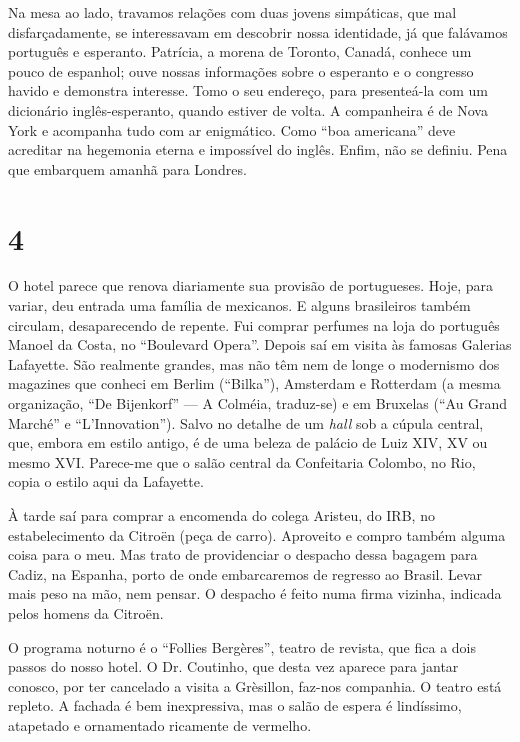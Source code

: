 Na mesa ao lado, travamos relações com duas jovens simpáticas, que mal disfarçadamente, se interessavam em descobrir nossa identidade, já que falávamos português e esperanto. Patrícia, a morena de Toronto, Canadá, conhece um pouco de espanhol; ouve nossas informações sobre o esperanto e o congresso havido e demonstra interesse. Tomo o seu endereço, para presenteá-la com um dicionário inglês-esperanto, quando estiver de volta. A companheira é de Nova York e acompanha tudo com ar enigmático. Como ``boa americana'' deve acreditar na hegemonia eterna e impossível do inglês. Enfim, não se definiu. Pena que embarquem amanhã para Londres.

\section*{4 \adfflatleafright {}}
O hotel parece que renova diariamente sua provisão de portugueses. Hoje, para variar, deu entrada uma família de mexicanos. E alguns brasileiros também circulam, desaparecendo de repente. Fui comprar perfumes na loja do português Manoel da Costa, no ``Boulevard Opera''. Depois saí em visita às famosas Galerias Lafayette. São realmente grandes, mas não têm nem de longe o modernismo dos magazines que conheci em Berlim (``Bilka''), Amsterdam e Rotterdam (a mesma organização, ``De Bijenkorf'' --- A Colméia, traduz-se) e em Bruxelas (``Au Grand Marché'' e ``L’Innovation''). Salvo no detalhe de um \textit{hall} sob a cúpula central, que, embora em estilo antigo, é de uma beleza de palácio de Luiz XIV, XV ou mesmo XVI. Parece-me que o salão central da Confeitaria Colombo, no Rio, copia o estilo aqui da Lafayette.

À tarde saí para comprar a encomenda do colega Aristeu, do IRB, no estabelecimento da Citroën (peça de carro). Aproveito e compro também alguma coisa para o meu. Mas trato de providenciar o despacho dessa bagagem para Cadiz, na Espanha, porto de onde embarcaremos de regresso ao Brasil. Levar mais peso na mão, nem pensar. O despacho é feito numa firma vizinha, indicada pelos homens da Citroën.

O programa noturno é o ``Follies Bergères'', teatro de revista, que fica a dois passos do nosso hotel. O Dr. Coutinho, que desta vez aparece para jantar conosco, por ter cancelado a visita a Grèsillon, faz-nos companhia. O teatro está repleto. A fachada é bem inexpressiva, mas o salão de espera é lindíssimo, atapetado e ornamentado ricamente de vermelho.

